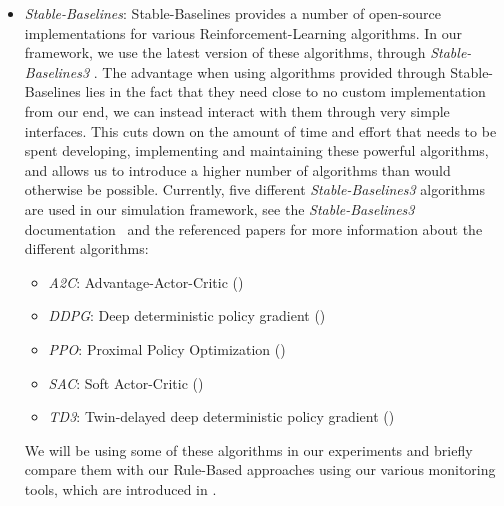 \begin{itemize}
	\item {}\emph{Stable-Baselines}:\label{item:StableBaselines} Stable-Baselines provides a number of open-source implementations for various Reinforcement-Learning algorithms. In our framework, we use the latest version of these algorithms, through \emph{Stable-Baselines3} \cite{StableBaselines3}. The advantage when using algorithms provided through Stable-Baselines lies in the fact that they need close to no custom implementation from our end, we can instead interact with them through very simple interfaces. This cuts down on the amount of time and effort that needs to be spent developing, implementing and maintaining these powerful algorithms, and allows us to introduce a higher number of algorithms than would otherwise be possible. Currently, five different \emph{Stable-Baselines3} algorithms are used in our simulation framework, see the \emph{Stable-Baselines3} documentation~\cite{StableBaselines3Algorithms} and the referenced papers for more information about the different algorithms:
	      \begin{itemize}
		      \item \emph{A2C}: Advantage-Actor-Critic (\cite{StableBaselines3A2C})
		      \item \emph{DDPG}: Deep deterministic policy gradient (\cite{StableBaselines3DDPG})
		      \item \emph{PPO}: Proximal Policy Optimization (\cite{StableBaselines3PPO})
		      \item \emph{SAC}: Soft Actor-Critic (\cite{StableBaselines3SAC})
		      \item \emph{TD3}: Twin-delayed deep deterministic policy gradient (\cite{StableBaselines3TD3})
	      \end{itemize}
	      We will be using some of these algorithms in our experiments and briefly compare them with our Rule-Based approaches using our various monitoring tools, which are introduced in .
\end{itemize}
